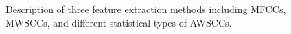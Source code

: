 \begin{figure}[htb!] %
\caption{Description of three feature extraction methods including MFCCs, MWSCCs, and different statistical types of AWSCCs.}
\label{fig:featureExtraction} 
\end{figure}


